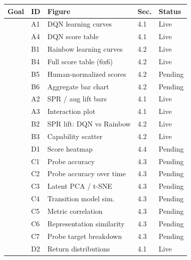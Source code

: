 \documentclass[11pt]{article}
\begin{document}
\begin{table}[H]
\centering
\footnotesize
\renewcommand{\arraystretch}{1.25}
\setlength{\tabcolsep}{5pt}
\begin{tabular}{l l l l l}
\toprule
\textbf{Goal} & \textbf{ID} & \textbf{Figure} & \textbf{Sec.}
  & \textbf{Status} \\
\midrule
{}
  & A1 & DQN learning curves       & 4.1 & Live \\
  & A4 & DQN score table           & 4.1 & Live \\
  & B1 & Rainbow learning curves   & 4.2 & Live \\
  & B4 & Full score table (6x6)    & 4.2 & Live \\
  & B5 & Human-normalized scores   & 4.2 & Pending \\
  & B6 & Aggregate bar chart       & 4.2 & Pending \\
\midrule
{}
  & A2 & SPR / aug lift bars       & 4.1 & Live \\
  & A3 & Interaction plot          & 4.1 & Live \\
  & B2 & SPR lift: DQN vs Rainbow  & 4.2 & Live \\
  & B3 & Capability scatter        & 4.2 & Live \\
  & D1 & Score heatmap             & 4.4 & Pending \\
\midrule
{}
  & C1 & Probe accuracy            & 4.3 & Pending \\
  & C2 & Probe accuracy over time  & 4.3 & Pending \\
  & C3 & Latent PCA / t-SNE        & 4.3 & Pending \\
  & C4 & Transition model sim.     & 4.3 & Pending \\
  & C5 & Metric correlation        & 4.3 & Pending \\
  & C6 & Representation similarity & 4.3 & Pending \\
  & C7 & Probe target breakdown    & 4.3 & Pending \\
\midrule
{}
  & D2 & Return distributions      & 4.1 & Live \\

\end{tabular}
\end{table}
\end{document}
